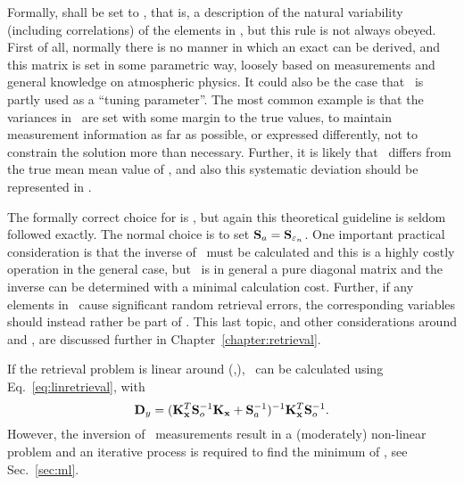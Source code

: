 Formally,  shall be set to \aCvrMtr{\SttVct} \citep{rodgers:00},
that is, a description of the natural variability (including correlations) of
the elements in \SttVct, but this rule is not always obeyed. First of all,
normally there is no manner in which an exact \aCvrMtr{\SttVct} can be derived,
and this matrix is set in some parametric way, loosely based on measurements
and general knowledge on atmospheric physics\addref. It could also be the case
that \ is partly used as a ``tuning parameter''. The most common
example is that the variances in \ are set with some margin to the
true values, to maintain measurement information as far as possible, or
expressed differently, not to constrain the solution more than necessary.
Further, it is likely that \ differs from the true mean mean value
of \SttVct, and also this systematic deviation should be represented in
 \citep{eriksson:analy:00}.

The formally correct choice for  is 
\citep{eriksson:analy:00,rodgers:00}, but again this theoretical guideline is
seldom followed exactly. The normal choice is to set
$\mathbf{S}_{a}=\mathbf{S}_{\varepsilon_n}$. One important practical consideration is
that the inverse of \ must be calculated and this is a
highly costly operation in the general case, but \ is in
general a pure diagonal matrix and the inverse can be determined with a minimal
calculation cost. Further, if any elements in \FrwMdlVct\ cause significant
random retrieval errors, the corresponding variables should instead rather be
part of \SttVct. This last topic, and other considerations around 
and , are discussed further in Chapter~\ref{chapter:retrieval}.

If the retrieval problem is linear around (,\FrwMdlVctHat), \RtrVct\
can be calculated using Eq.~\ref{eq:linretrieval}, with
\citep[][Eq.~4.5]{rodgers:00}
\begin{equation}
  \label{eq:lindy}
  \mathbf{D}_{y} = (\mathbf{K}_{\mathbf{x}}^T\mathbf{S}_{o}^{-1}\mathbf{K}_{\mathbf{x}}
  +\mathbf{S}_{a}^{-1})^{-1}\mathbf{K}_{\mathbf{x}}^T\mathbf{S}_{o}^{-1}.
\end{equation}
However, the inversion of \smr\ measurements result in a (moderately)
non-linear problem and an iterative process is required to find the minimum of
\CstFnc, see Sec.~\ref{sec:ml}.


